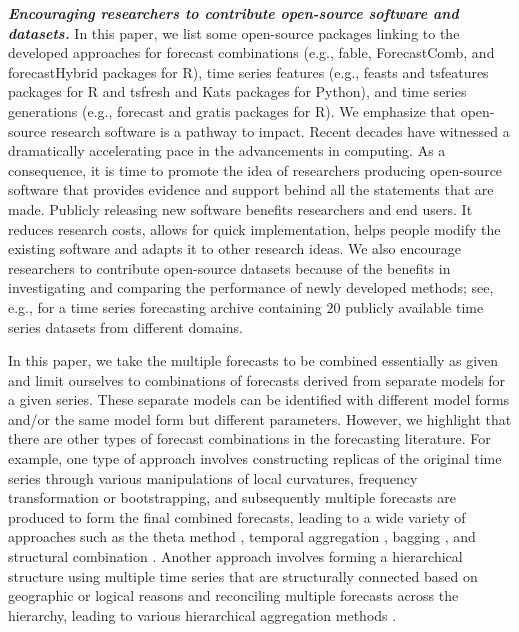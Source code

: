 \documentclass[a4paper,11pt]{article}
\newcommand{\pkg}[1]{{\normalfont\fontseries{b}\selectfont #1}}
\let\proglang=\textsf
\begin{document}
\textbf{\textit{Encouraging researchers to contribute open-source software and datasets.}} In this paper, we list some open-source packages linking to the developed approaches for forecast combinations (e.g., \pkg{fable}, \pkg{ForecastComb}, and \pkg{forecastHybrid} packages for \proglang{R}), time series features (e.g., \pkg{feasts} and \pkg{tsfeatures} packages for \proglang{R} and \pkg{tsfresh} and \pkg{Kats} packages for \proglang{Python}), and time series generations (e.g., \pkg{forecast} and \pkg{gratis} packages for \proglang{R}). We emphasize that open-source research software is a pathway to impact. Recent decades have witnessed a dramatically accelerating pace in the advancements in computing. As a consequence, it is time to promote the idea of researchers producing open-source software that provides evidence and support behind all the statements that are made. Publicly releasing new software benefits researchers and end users. It reduces research costs, allows for quick implementation, helps people modify the existing software and adapts it to other research ideas. We also encourage researchers to contribute open-source datasets because of the benefits in investigating and comparing the performance of newly developed methods; see, e.g., \citet{Godahewa2021-mo,Godahewa2021-wb} for a time series forecasting archive containing $20$ publicly available time series datasets from different domains.

In this paper, we take the multiple forecasts to be combined essentially as given and limit ourselves to combinations of forecasts derived from separate models for a given series. These separate models can be identified with different model forms and/or the same model form but different parameters. However, we highlight that there are other types of forecast combinations in the forecasting literature. For example, one type of approach involves constructing replicas of the original time series through various manipulations of local curvatures, frequency transformation or bootstrapping, and subsequently multiple forecasts are produced to form the final combined forecasts, leading to a wide variety of approaches such as the theta method \citep{Assimakopoulos2000-cc}, temporal aggregation \citep[e.g.,][]{Kourentzes2014-wz,Kourentzes2016-qq,Kourentzes2017-xe}, bagging \citep[e.g.,][]{Bergmeir2016-ae,Petropoulos2018-fw}, and structural combination \citep[e.g.,][]{Rendon-Sanchez2019-qm}. Another approach involves forming a hierarchical structure using multiple time series that are structurally connected based on geographic or logical reasons and reconciling multiple forecasts across the hierarchy, leading to various hierarchical aggregation methods \citep[e.g.,][]{Hyndman2011-sd,Wickramasuriya2019-fc,Taieb2021-tc,Hollyman2021-tn}.
\end{document}
